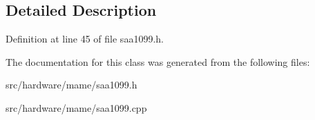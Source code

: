 \subsection{Detailed Description}


Definition at line 45 of file saa1099.\-h.



The documentation for this class was generated from the following files\-:\begin{DoxyCompactItemize}
\item 
src/hardware/mame/saa1099.\-h\item 
src/hardware/mame/saa1099.\-cpp\end{DoxyCompactItemize}
